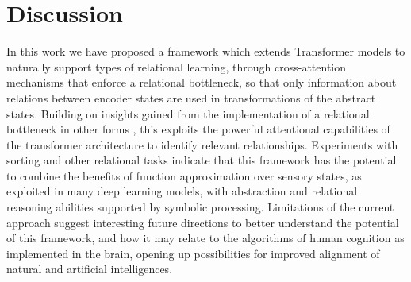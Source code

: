 \section{Discussion}\label{sec:discuss}

In this work we have proposed a framework which extends Transformer models to 
naturally support types of relational learning, through cross-attention
mechanisms that enforce a relational bottleneck, so that only information about relations between encoder states
are used in transformations of the abstract states.
Building on insights gained from the implementation of a relational bottleneck in other forms \citep{esbn, kerg2022neural}, this exploits the powerful attentional capabilities of the transformer architecture to identify relevant relationships.
Experiments with sorting and other relational tasks indicate that this framework has the potential to combine the
benefits of function approximation over sensory states, as exploited in many deep learning models, with abstraction and relational reasoning abilities supported by symbolic processing.
Limitations of the current approach suggest interesting
future directions to better understand the potential of this framework, and
how it may relate to the algorithms of human cognition as implemented in the brain, opening up possibilities for 
improved alignment of natural and artificial intelligences.

